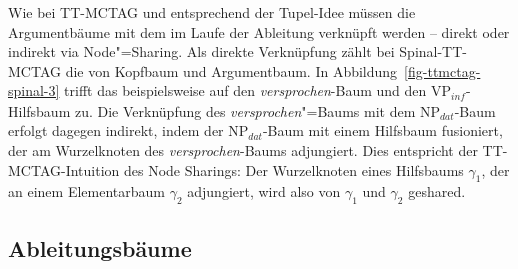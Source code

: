 Wie bei TT-MCTAG und entsprechend der Tupel-Idee müssen die Argumentbäume mit dem  im Laufe der Ableitung verknüpft werden -- direkt oder indirekt via Node"=Sharing. Als direkte Verknüpfung zählt bei Spinal-TT-MCTAG die  von Kopfbaum und Argumentbaum. In Abbildung~\ref{fig-ttmctag-spinal-3} trifft das beispielsweise auf den {\it versprochen}-Baum und den VP$_{\mathit{inf}}$-Hilfsbaum zu. Die Verknüpfung des {\it versprochen}"=Baums mit dem NP$_{\mathit{dat}}$-Baum erfolgt dagegen indirekt, indem der NP$_{\mathit{dat}}$-Baum mit einem Hilfsbaum fusioniert, der am Wurzelknoten des {\it versprochen}-Baums adjungiert. Dies entspricht der TT-MCTAG-Intuition des Node Sharings: Der Wurzelknoten eines Hilfsbaums $\gamma_1$, der an einem Elementarbaum $\gamma_2$ adjungiert, wird also von $\gamma_1$ und $\gamma_2$ geshared.

\subsection{Ableitungsbäume}

